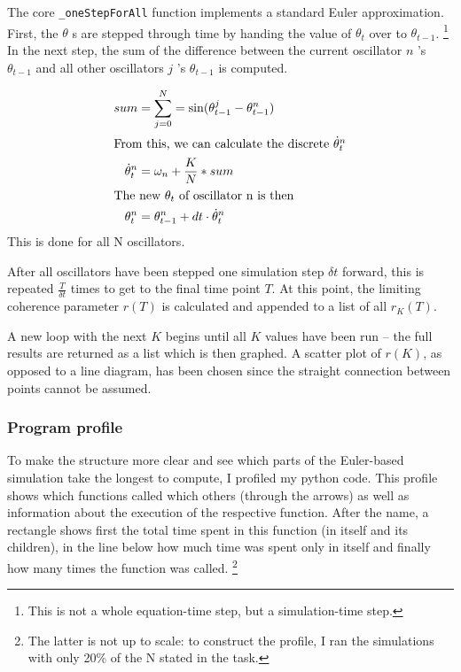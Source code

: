 \documentclass[11pt,a4paper]{article}
\newcommand{\graph}{\medskip\noindent}
\newcommand{\code}[1]{\texttt{#1}}
\begin{document}
The core \code{\_oneStepForAll} function implements a standard Euler approximation.
First, the $\theta$ s are stepped through time by handing the value of $\theta_{t}$ over to $\theta_{t-1}$.%
	\footnote{This is not a whole equation-time step, but a simulation-time step.}
In the next step, the sum of the difference between the current oscillator $n$ 's $\theta_{t-1}$ and all other oscillators $j$ 's $\theta_{t-1}$ is computed. 


\begin{align*}
	sum 					& = \sum_{j = 0}^N = \sin(\theta^j_{t-1} - \theta^n_{t-1}) \\
\intertext{From this, we can calculate the discrete $\dot{\theta}_t^n$}
	\dot{\theta}_t^n 		& = \omega_n + \frac{K}{N} *  sum \\
\intertext{The new $\theta_t$ of oscillator n is then}
	\theta^n_t 				& = \theta^n_{t-1} + dt \cdot \dot{\theta}_t^n \\
\end{align*}
This is done for all N oscillators. 

\graph
After all oscillators have been stepped one simulation step $\delta t$ forward, this is repeated $\frac{T}{\delta t}$ times to get to the final time point $T$.
At this point, the limiting coherence parameter $r(T)$ is calculated and appended to a list of all $r_K(T)$. 

A new loop with the next $K$ begins until all $K$ values have been run -- the full results are returned as a list which is then graphed.
A scatter plot of $r(K)$, as opposed to a line diagram, has been chosen since the straight connection between points cannot be assumed.





\subsubsection{Program profile}
To make the structure more clear and see which parts of the Euler-based simulation take the longest to compute, I profiled my python code. 
This profile shows which functions called which others (through the arrows) as well as information about the execution of the respective function. 
After the name, a rectangle shows first the total time spent in this function (in itself and its children), in the line below how much time was spent only in itself and finally how many times the function was called.%
	\footnote{The latter is not up to scale: to construct the profile, I ran the simulations with only 20\% of the N stated in the task.}
\end{document}
